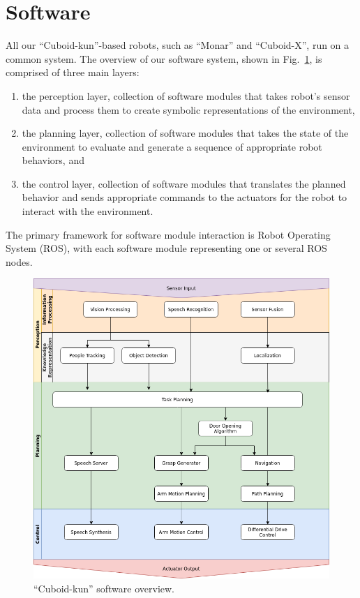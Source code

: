 \documentclass[runningheads,a4paper]{llncs}
\begin{document}
\section{Software}
All our ``Cuboid-kun''-based robots, such as ``Monar'' and ``Cuboid-X'', run on a common system.
The overview of our software system, shown in Fig.~\ref{fig:software}, is comprised of three main layers:
\begin{enumerate}
    \item the perception layer, collection of software modules that takes robot’s sensor data and process them to create symbolic representations of the environment,
    \item the planning layer, collection of software modules that takes the state of the environment to evaluate and generate a sequence of appropriate robot behaviors, and
    \item the control layer, collection of software modules that translates the planned behavior and sends appropriate commands to the actuators for the robot to interact with the environment.
\end{enumerate}
The primary framework for software module interaction is Robot Operating System (ROS), with each software module representing one or several ROS nodes.
\begin{figure}[tbp]
    \centering
    \includegraphics[width=0.6\linewidth]{images/SoftwareOverview.png}
    \caption{``Cuboid-kun'' software overview.}
    \label{fig:software}
\end{figure}
\end{document}
